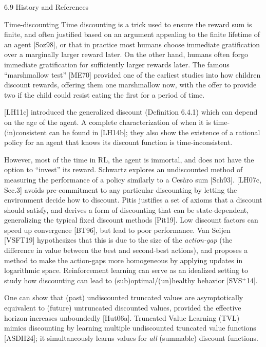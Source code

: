 \documentclass[aspectratio=169,10pt]{beamer}
\begin{document}
\begin{frame}[allowframebreaks]{6.9 History and References}
\framebreak

\begin{block}{Time-discounting}
Time discounting is a trick used to ensure the reward sum is finite, and
often justified based on an argument appealing to the finite lifetime of an
agent [Soz98], or that in practice most humans choose immediate
gratification over a marginally larger reward later. On the other hand,
humans often forgo immediate gratification for sufficiently larger rewards
later. The famous ``marshmallow test'' [ME70] provided one of the earliest
studies into how children discount rewards, offering them one marshmallow
now, with the offer to provide two if the child could resist eating the
first for a period of time.
\end{block}

\vspace{0.1cm}
[LH11c] introduced the generalized discount (Definition 6.4.1) which can
depend on the age of the agent. A complete characterization of when it is
time-(in)consistent can be found in [LH14b]; they also show the existence
of a rational policy for an agent that knows its discount function is
time-inconsistent.

\vspace{0.1cm}
However, most of the time in RL, the agent is immortal, and does not have
the option to ``invest'' its reward. Schwartz explores an undiscounted
method of measuring the performance of a policy similarly to a Ces\`aro sum
[Sch93]. [LH07c, Sec.3] avoids pre-commitment to any particular discounting
by letting the environment decide how to discount. Pitis justifies a set of
axioms that a discount should satisfy, and derives a form of discounting
that can be state-dependent, generalizing the typical fixed discount
methods [Pit19]. Low discount factors can speed up convergence [BT96], but
lead to poor performance. Van Seijen [VSFT19] hypothesizes that this is due
to the size of the \emph{action-gap} (the difference in value between the
best and second-best actions), and proposes a method to make the
action-gaps more homogeneous by applying updates in logarithmic space.
Reinforcement learning can serve as an idealized setting to study how
discounting can lead to (sub)optimal/(un)healthy behavior [SVS$^{+}$14].

\vspace{0.1cm}
One can show that (past) undiscounted truncated values are asymptotically
equivalent to (future) untruncated discounted values, provided the
effective horizon increases unboundedly [Hut06a]. Truncated Value Learning
(TVL) mimics discounting by learning multiple undiscounted truncated value
functions [ASDH24]; it simultaneously learns values for \emph{all}
(summable) discount functions.
\end{frame}
\end{document}
